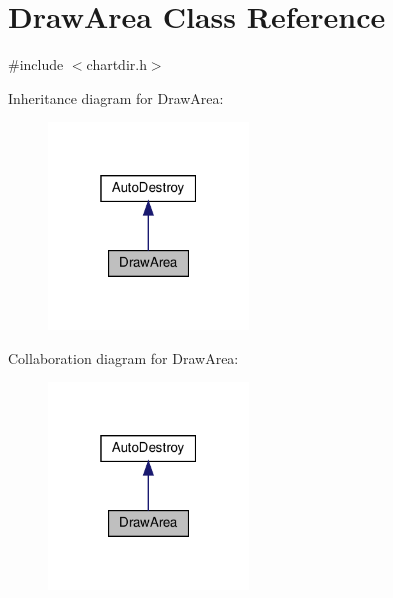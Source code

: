 \hypertarget{class_draw_area}{}\section{Draw\+Area Class Reference}
\label{class_draw_area}


{\ttfamily \#include $<$chartdir.\+h$>$}



Inheritance diagram for Draw\+Area\+:
\nopagebreak
\begin{figure}[H]
\begin{center}
\leavevmode
\includegraphics[width=151pt]{class_draw_area__inherit__graph}
\end{center}
\end{figure}


Collaboration diagram for Draw\+Area\+:
\nopagebreak
\begin{figure}[H]
\begin{center}
\leavevmode
\includegraphics[width=151pt]{class_draw_area__coll__graph}
\end{center}
\end{figure}
